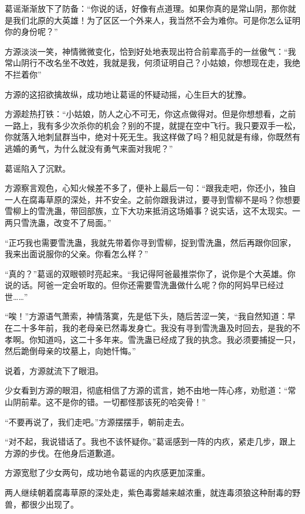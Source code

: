 
\begin{this_body}

葛谣渐渐放下了防备：“你说的话，好像有点道理。如果你真的是常山阴，那你就是我们北原的大英雄！为了区区一个外来人，我当然不会为难你。可是你怎么证明你的身份呢？”

方源淡淡一笑，神情微微变化，恰到好处地表现出符合前辈高手的一丝傲气：“我常山阴行不改名坐不改姓，我就是我，何须证明自己？小姑娘，你想现在走，我绝不拦着你”

方源的这招欲擒故纵，成功地让葛谣的怀疑动摇，心生巨大的犹豫。

方源趁热打铁：“小姑娘，防人之心不可无，你这点做得对。但是你想想看，之前一路上，我有多少次杀你的机会？别的不提，就提在空中飞行。我只要双手一松，你就落入地刺鼠群当中，绝对十死无生。我这样做了吗？相见就是有缘，你既然有逃婚的勇气，为什么就没有勇气来面对我呢？”

葛谣陷入了沉默。

方源察言观色，心知火候差不多了，便补上最后一句：“跟我走吧，你还小，独自一人在腐毒草原的深处，并不安全。之前你跟我讲过，要寻到雪柳不是吗？你想要雪柳上的雪洗蛊，带回部族，立下大功来抵消这场婚事？说实话，这不太现实。一两只雪洗蛊，改变不了局面。”

“正巧我也需要雪洗蛊，我就先带着你寻到雪柳，捉到雪洗蛊，然后再跟你回家，我来出面说服你的父亲。你看怎么样？”

“真的？”葛谣的双眼顿时亮起来。“我记得阿爸最推崇你了，说你是个大英雄。你说的话。阿爸一定会听取的。但你还需要雪洗蛊做什么呢？你的阿妈早已经过世……”

“唉！”方源语气萧索，神情落寞，先是低下头，随后苦涩一笑，“我自然知道：早在二十多年前，我的老母亲已然毒发身亡。我没有寻到雪洗蛊及时回去，是我的不孝啊。你知道吗，这二十多年来。雪洗蛊已经成了我的执念。我必须要捕捉一只，然后跪倒母亲的坟墓上，向她忏悔。”

说着，方源就流下了眼泪。

少女看到方源的眼泪，彻底相信了方源的谎言，她不由地一阵心疼，劝慰道：“常山阴前辈。这不是你的错。一切都怪那该死的哈突骨！”

“不要再说了，我们走吧。”方源摆摆手，朝前走去。

“对不起，我说错话了。我也不该怀疑你。”葛谣感到一阵的内疚，紧走几步，跟上方源的步伐。在他身后道歉道。

方源宽慰了少女两句，成功地令葛谣的内疚感更加深重。

两人继续朝着腐毒草原的深处走，紫色毒雾越来越浓重，就连毒须狼这种耐毒的野兽，都很少出现了。


\end{this_body}
